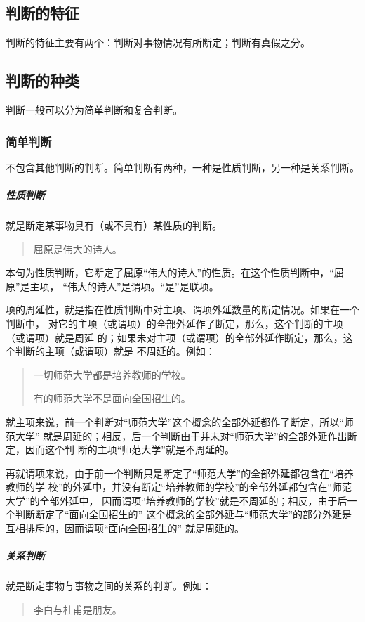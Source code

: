 \documentclass[final,oneside]{ctexbook}
\newenvironment{equotation}{\begin{quotation}\kaishu}{\end{quotation}}
\begin{document}
\subsection{判断的特征}

判断的特征主要有两个：判断对事物情况有所断定；判断有真假之分。

\subsection{判断的种类}

判断一般可以分为简单判断和复合判断。

\subsubsection{简单判断}

不包含其他判断的判断。简单判断有两种，一种是性质判断，另一种是关系判断。

\subparagraph{性质判断}就是断定某事物具有（或不具有）某性质的判断。
\begin{equotation}
  屈原是伟大的诗人。
\end{equotation}
本句为性质判断，它断定了屈原“伟大的诗人”的性质。在这个性质判断中，“屈原”是主项，
“伟大的诗人”是谓项。“是”是联项。

项的周延性，就是指在性质判断中对主项、谓项外延数量的断定情况。如果在一个判断中，
对它的主项（或谓项）的全部外延作了断定，那么，这个判断的主项（或谓项）就是周延
的；如果未对主项（或谓项）的全部外延作断定，那么，这个判断的主项（或谓项）就是
不周延的。例如：
\begin{equotation}
  一切师范大学都是培养教师的学校。

  有的师范大学不是面向全国招生的。
\end{equotation}
就主项来说，前一个判断对“师范大学”这个概念的全部外延都作了断定，所以“师范大学”
就是周延的；相反，后一个判断由于并未对“师范大学”的全部外延作出断定，因而这个判
断的主项“师范大学”就是不周延的。

再就谓项来说，由于前一个判断只是断定了“师范大学”的全部外延都包含在“培养教师的学
校”的外延中，并没有断定“培养教师的学校”的全部外延都包含在“师范大学”的全部外延中，
因而谓项“培养教师的学校”就是不周延的；相反，由于后一个判断断定了“面向全国招生的”
这个概念的全部外延与“师范大学”的部分外延是互相排斥的，因而谓项“面向全国招生的”
就是周延的。

\subparagraph{关系判断}就是断定事物与事物之间的关系的判断。例如：
\begin{equotation}
  李白与杜甫是朋友。
\end{equotation}
\end{document}
